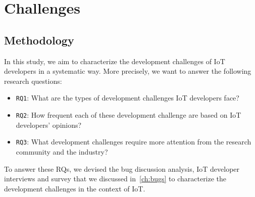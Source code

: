  
\chapter{Challenges}
\label{ch:Challenges}

\section{Methodology}
In this study, we aim to characterize the development challenges of IoT developers in a systematic way. More precisely, we want to answer the following research questions:
\begin{itemize}
\item {\verb|RQ1|}: What are the types of development challenges IoT developers face?
\item {\verb|RQ2|}: How frequent each of these development challenge are based on IoT developers' opinions?
\item {\verb|RQ3|}: What development challenges require more attention from the research community and the industry?
\end{itemize}

To answer these RQs, we devised the bug discussion analysis, IoT developer interviews and survey that we discussed in~\autoref{ch:bugs} to characterize the development challenges in the context of IoT. 

